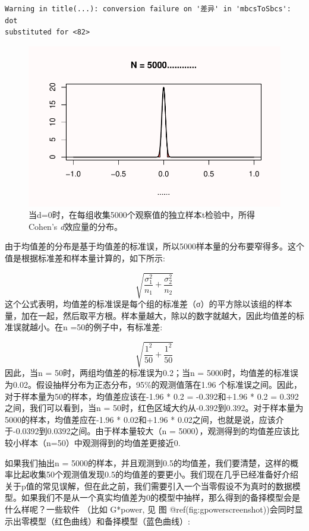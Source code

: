 \documentclass[
  letterpaper,
  DIV=11,
  numbers=noendperiod]{scrreprt}
\begin{document}
\begin{verbatim}
Warning in title(...): conversion failure on '差异' in 'mbcsToSbcs': dot
substituted for <82>
\end{verbatim}

\begin{figure}

{\centering \includegraphics[width=1\textwidth,height=\textheight]{01-pvalue_files/figure-pdf/fig-fig132-1.pdf}

}

\caption{\label{fig-fig132}当d=0时，在每组收集5000个观察值的独立样本t检验中，所得Cohen's
\emph{d}效应量的分布。}

\end{figure}

由于均值差的分布是基于均值差的标准误，所以5000样本量的分布要窄得多。这个值是根据标准差和样本量计算的，如下所示:

\[\sqrt{\frac{\sigma_{1}^{2}}{n_{1}}+\frac{\sigma_{2}^{2}}{n_{2}}}\]
这个公式表明，均值差的标准误是每个组的标准差（σ）的平方除以该组的样本量，加在一起，然后取平方根。样本量越大，除以的数字就越大，因此均值差的标准误就越小。在n
=50的例子中，有标准差:

\[\sqrt{\frac{1^{2}}{50}+\frac{1^{2}}{50}}\] 因此，当n =
50时，两组均值差的标准误为0.2；当n =
5000时，均值差的标准误为0.02。假设抽样分布为正态分布，95\%的观测值落在1.96
个标准误之间。因此，对于样本量为50的样本，均值差应该在-1.96 * 0.2 =
-0.392和+1.96 * 0.2 = 0.392之间，我们可以看到，当n =
50时，红色区域大约从-0.392到0.392。对于样本量为5000的样本，均值差应在-1.96
* 0.02和+1.96 *
0.02之间，也就是说，应该介于-0.0392到0.0392之间。由于样本量较大（n =
5000），观测得到的均值差应该比较小样本（n=50）中观测得到的均值差更接近0.

如果我们抽出n =
5000的样本，并且观测到0.5的均值差，我们要清楚，这样的概率比起收集50个观测值发现0.5的均值差的要更小。我们现在几乎已经准备好介绍关于p值的常见误解，但在此之前，我们需要引入一个当零假设不为真时的数据模型。如果我们不是从一个真实均值差为0的模型中抽样，那么得到的备择模型会是什么样呢？一些软件
（比如 G*power, 见 图
@ref(fig:gpowerscreenshot))会同时显示出零模型（红色曲线）和备择模型（蓝色曲线）:
\end{document}
